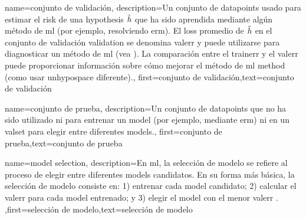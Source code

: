 {name={conjunto de validación},
  description={Un conjunto de \gls{datapoint}s usado para 
  	estimar el \gls{risk} de una \gls{hypothesis} $\hat{h}$ que ha sido 
  	aprendida mediante algún método de \gls{ml} (por ejemplo, resolviendo \gls{erm}). El \gls{loss} promedio de $\hat{h}$ 
  	en el conjunto de validación \gls{validation} se denomina \gls{valerr} y puede utilizarse para diagnosticar un método de 
  	\gls{ml} (vea \cite[Sec. 6.6]{MLBasics}). La comparación entre el \gls{trainerr} 
  	y el \gls{valerr} puede proporcionar información sobre cómo mejorar el método de \gls{ml} method (como usar 
  	un\gls{hypospace} diferente).},
	first={conjunto de validación},text={conjunto de validación}  
}

{
	name={conjunto de prueba},
	description={Un conjunto de \gls{datapoint}s que no ha sido 
		utilizado ni para entrenar un \gls{model} (por ejemplo, mediante \gls{erm}) ni en un 
		\gls{valset} para elegir entre diferentes \gls{model}s.}, 
	first={conjunto de prueba},text={conjunto de prueba}  
}


{name={model selection},
	description={En \gls{ml}, la selección de modelo se refiere al 
		proceso de elegir entre diferentes \gls{model}s candidatos. En su forma más  
		básica, la selección de modelo consiste en: 1) entrenar cada \gls{model} candidato; 
		2) calcular el \gls{valerr} para cada \gls{model} entrenado; y 3) elegir el \gls{model} 
		con el menor \gls{valerr} \cite[Ch. 6]{MLBasics}. },first={selección de modelo},text={selección de modelo}  
}







